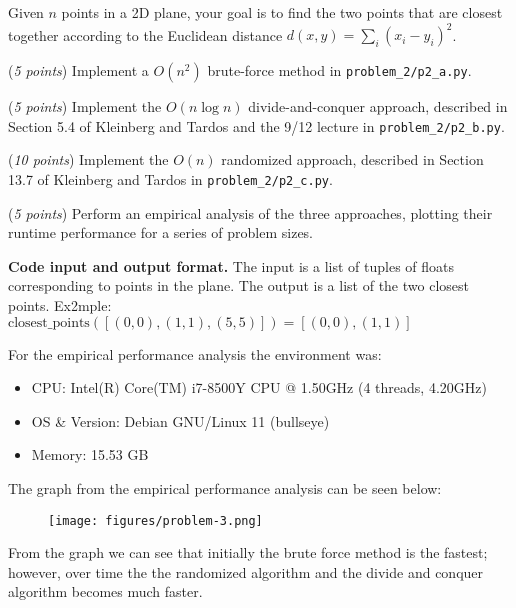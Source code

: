 \documentclass{hw}
\newcommand{\io}{\textbf{Code input and output format.} }
\begin{document}
\begin{problem}
  Given $n$ points in a 2D plane, your goal is to find the two points that are closest together
  according to the Euclidean distance $d(x,y) = \sum_i (x_i - y_i)^2$.

  \begin{subproblem}
    (\textit{5 points}) Implement a $O(n^2)$ brute-force method in \texttt{problem\_2/p2\_a.py}.
  \end{subproblem}

  \begin{subproblem}
    (\textit{5 points}) Implement the $O(n \log n)$ divide-and-conquer approach,
    described in Section 5.4 of Kleinberg and Tardos and the 9/12 lecture in \texttt{problem\_2/p2\_b.py}.
  \end{subproblem}

  \begin{subproblem}
    (\textit{10 points}) Implement the $O(n)$ randomized approach,
    described in Section 13.7 of Kleinberg and Tardos in \texttt{problem\_2/p2\_c.py}.
  \end{subproblem}

  \begin{subproblem}
      (\textit{5 points})
      Perform an empirical analysis of the three approaches,
      plotting their runtime performance for a series of problem sizes.
  \end{subproblem}

  \io The input is a list of tuples of floats corresponding to points in the plane.
  The output is a list of the two closest points.
  Ex2mple: $\text{closest\_points}([(0,0), (1,1), (5,5)]) = [(0,0), (1,1)]$
\end{problem}

\begin{solution}
For the empirical performance analysis the environment was:
        \begin{itemize}
            \item CPU: Intel(R) Core(TM) i7-8500Y CPU @ 1.50GHz (4 threads, 4.20GHz)
            \item OS \& Version: Debian GNU/Linux 11 (bullseye)
            \item Memory: 15.53 GB
        \end{itemize}
            
        The graph from the empirical performance analysis can be seen below:
\begin{figure}[ht]
  \centering
      \texttt{[image: figures/problem-3.png]}
\end{figure}
From the graph we can see that initially the brute force method is the fastest; however, over time the the randomized algorithm and the divide and conquer algorithm becomes much faster.
\end{solution}
\newpage
\end{document}
